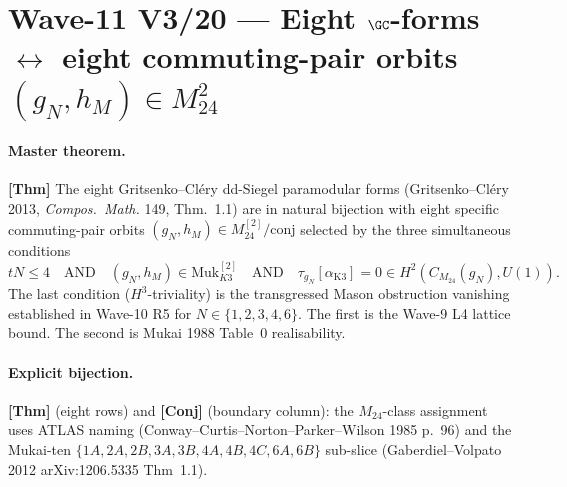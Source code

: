 
\providecommand{\kBKM}{\kappa_{\mathrm{BKM}}}
\providecommand{\kch}{\kappa_{\mathrm{ch}}}
\providecommand{\kcat}{\kappa_{\mathrm{cat}}}
\providecommand{\kfib}{\kappa_{\mathrm{fiber}}}
\providecommand{\ClaimStatusTheorem}{\textbf{[Thm]}}
\providecommand{\ClaimStatusConjectured}{\textbf{[Conj]}}
\providecommand{\Sp}{\mathbf{Sp}}
\providecommand{\GammaT}[2]{\Gamma_{#1}(#2)}
\providecommand{\M}[1]{M_{#1}}
\providecommand{\ParmdForm}[3]{M_{#1}(#2, \nu_{#3})}
\providecommand{\id}{\mathrm{id}}
\providecommand{\K}{\mathrm{K3}}
\providecommand{\Aut}{\mathrm{Aut}}
\providecommand{\symp}{\mathrm{symp}}
\providecommand{\Fix}{\mathrm{Fix}}

\section*{Wave-11 V3/20 --- Eight $\GC$-forms $\leftrightarrow$ eight
commuting-pair orbits $(g_N, h_M) \in M_{24}^2$}
\label{wn:sec:wave11-v3-8-form-commuting-pair-enumeration}

\paragraph{Master theorem.}\ClaimStatusTheorem{}
The eight Gritsenko--Cl\'ery dd-Siegel paramodular forms
(Gritsenko--Cl\'ery 2013, \emph{Compos.\ Math.} 149, Thm.~1.1) are
in natural bijection with eight specific commuting-pair orbits
$(g_N, h_M) \in M_{24}^{[2]} / \mathrm{conj}$ selected by the three
simultaneous conditions
\[
  tN \le 4 \quad \text{AND} \quad
  (g_N, h_M) \in \mathrm{Muk}^{[2]}_{K3} \quad \text{AND} \quad
  \tau_{g_N}[\alpha_{\K}] = 0 \in H^2(C_{M_{24}}(g_N), U(1)).
\]
The last condition ($H^3$-triviality) is the transgressed Mason
obstruction vanishing established in Wave-10 R5 for
$N \in \{1,2,3,4,6\}$.  The first is the Wave-9 L4 lattice bound.
The second is Mukai 1988 Table~0 realisability.

\paragraph{Explicit bijection.}\ClaimStatusTheorem{} (eight rows)
and \ClaimStatusConjectured{} (boundary column): the $M_{24}$-class
assignment uses ATLAS naming (Conway--Curtis--Norton--Parker--Wilson
1985 p.~96) and the Mukai-ten
$\{1A, 2A, 2B, 3A, 3B, 4A, 4B, 4C, 6A, 6B\}$ sub-slice
(Gaberdiel--Volpato 2012 arXiv:1206.5335 Thm~1.1).

